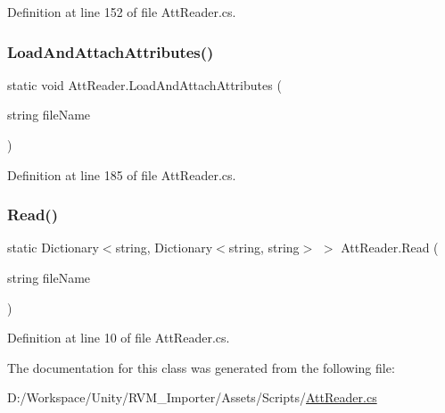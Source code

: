 Definition at line 152 of file Att\+Reader.\+cs.

\mbox{\label{class_att_reader_abec2d3da93fe798b11e4ba34a4289580}} 
\subsubsection{\texorpdfstring{LoadAndAttachAttributes()}{LoadAndAttachAttributes()}}
{\footnotesize\ttfamily static void Att\+Reader.\+Load\+And\+Attach\+Attributes (\begin{DoxyParamCaption}\item[{string}]{file\+Name }\end{DoxyParamCaption})\hspace{0.3cm}{\ttfamily [static]}}



Definition at line 185 of file Att\+Reader.\+cs.

\mbox{\label{class_att_reader_a52bf4faee965d1c5ef725eed6dad42a6}} 
\subsubsection{\texorpdfstring{Read()}{Read()}}
{\footnotesize\ttfamily static Dictionary$<$string, Dictionary$<$string, string$>$ $>$ Att\+Reader.\+Read (\begin{DoxyParamCaption}\item[{string}]{file\+Name }\end{DoxyParamCaption})\hspace{0.3cm}{\ttfamily [static]}}



Definition at line 10 of file Att\+Reader.\+cs.



The documentation for this class was generated from the following file\+:\begin{DoxyCompactItemize}
\item 
D\+:/\+Workspace/\+Unity/\+R\+V\+M\+\_\+\+Importer/\+Assets/\+Scripts/\mbox{\hyperlink{_att_reader_8cs}{Att\+Reader.\+cs}}\end{DoxyCompactItemize}
